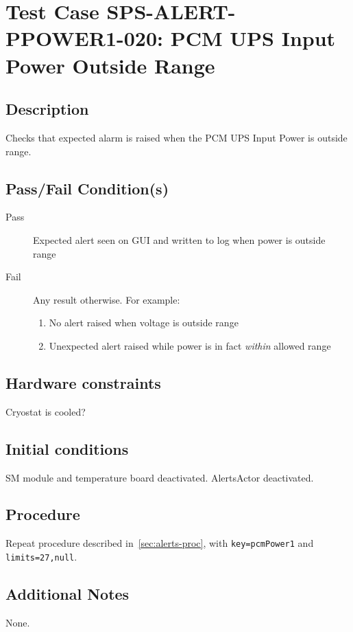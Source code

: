 \section{Test Case SPS-ALERT-PPOWER1-020: PCM UPS Input Power Outside Range}

\subsection{Description}

Checks that expected alarm is raised when the PCM UPS Input Power is outside range.

\subsection{Pass/Fail Condition(s)}

\begin{description}
\item [Pass] Expected alert seen on GUI and written to log when power is outside range
\item [Fail] Any result otherwise. For example:

\begin{enumerate}
    \item No alert raised when voltage is outside range
    \item Unexpected alert raised while power is in fact {\it within} allowed range
\end{enumerate}
\end{description}

\subsection{Hardware constraints}

Cryostat is cooled?

\subsection{Initial conditions}

SM module and temperature board deactivated. AlertsActor deactivated.

\subsection{Procedure}

Repeat procedure described in~\ref{sec:alerts-proc}, with \texttt{key=pcmPower1} and \texttt{limits=27,null}.

\subsection{Additional Notes}
None.